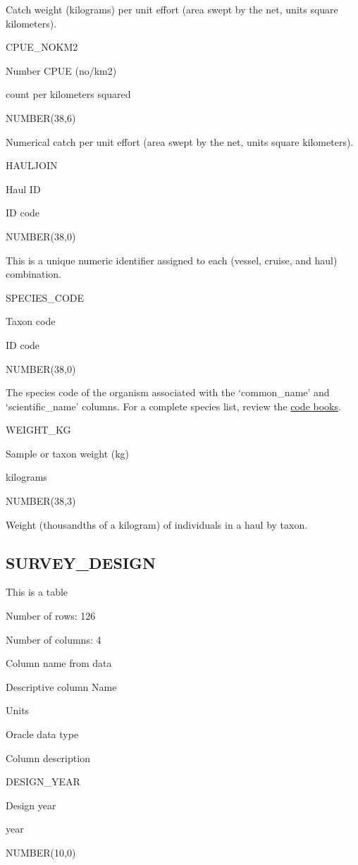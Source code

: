\documentclass[
  letterpaper,
  oneside,
  open=any]{scrbook}
\begin{document}
Catch weight (kilograms) per unit effort (area swept by the net, units
square kilometers).

CPUE\_NOKM2

Number CPUE (no/km2)

count per kilometers squared

NUMBER(38,6)

Numerical catch per unit effort (area swept by the net, units square
kilometers).

HAULJOIN

Haul ID

ID code

NUMBER(38,0)

This is a unique numeric identifier assigned to each (vessel, cruise,
and haul) combination.

SPECIES\_CODE

Taxon code

ID code

NUMBER(38,0)

The species code of the organism associated with the `common\_name' and
`scientific\_name' columns. For a complete species list, review the
\href{https://www.fisheries.noaa.gov/resource/document/groundfish-survey-species-code-manual-and-data-codes-manual}{code
books}.

WEIGHT\_KG

Sample or taxon weight (kg)

kilograms

NUMBER(38,3)

Weight (thousandths of a kilogram) of individuals in a haul by taxon.

\hypertarget{survey_design}{%
\subsection{SURVEY\_DESIGN}\label{survey_design}}

This is a table

Number of rows: 126

Number of columns: 4

Column name from data

Descriptive column Name

Units

Oracle data type

Column description

DESIGN\_YEAR

Design year

year

NUMBER(10,0)
\end{document}
